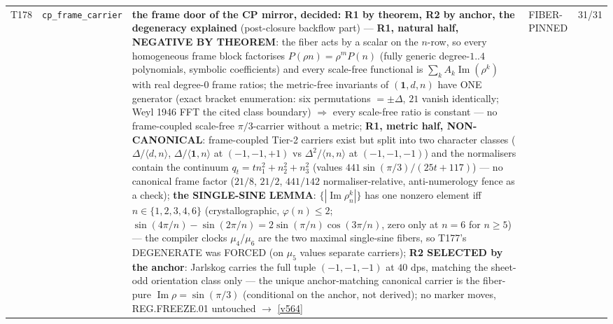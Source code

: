 \documentclass[11pt,a4paper]{article}
\begin{document}
{\begin{xltabular}{\linewidth}{@{}p{0.95cm} >{\raggedright\arraybackslash}p{3.1cm} Y >{\raggedright\scriptsize\arraybackslash}p{3.35cm} p{1.15cm}@{}}
T178 & \texttt{\scriptsize cp\_frame\_\allowbreak carrier} & \textbf{the frame door of the CP mirror, decided: R1 by theorem, R2 by anchor, the degeneracy explained} (post-closure backflow part) --- \textbf{R1, natural half, NEGATIVE BY THEOREM}: the fiber acts by a scalar on the $n$-row, so every homogeneous frame block factorises $P(\rho n)=\rho^{m}P(n)$ (fully generic degree-$1..4$ polynomials, symbolic coefficients) and every scale-free functional is $\sum_k A_k\operatorname{Im}(\rho^k)$ with real degree-$0$ frame ratios; the metric-free invariants of $(\mathbf1,d,n)$ have ONE generator (exact bracket enumeration: six permutations $=\pm\Delta$, $21$ vanish identically; Weyl 1946 FFT the cited class boundary) $\Rightarrow$ every scale-free ratio is constant --- no frame-coupled scale-free $\pi/3$-carrier without a metric; \textbf{R1, metric half, NON-CANONICAL}: frame-coupled Tier-2 carriers exist but split into two character classes ($\Delta/\langle d,n\rangle$, $\Delta/\langle\mathbf1,n\rangle$ at $(-1,-1,+1)$ vs $\Delta^{2}/\langle n,n\rangle$ at $(-1,-1,-1)$) and the normalisers contain the continuum $q_t=t n_1^2+n_2^2+n_3^2$ (values $441\sin(\pi/3)/(25t+117)$) --- no canonical frame factor ($21/8$, $21/2$, $441/142$ normaliser-relative, anti-numerology fence as a check); \textbf{the SINGLE-SINE LEMMA}: $\{|\operatorname{Im}\rho_n^k|\}$ has one nonzero element iff $n\in\{1,2,3,4,6\}$ (crystallographic, $\varphi(n)\le2$; $\sin(4\pi/n)-\sin(2\pi/n)=2\sin(\pi/n)\cos(3\pi/n)$, zero only at $n=6$ for $n\ge5$) --- the compiler clocks $\mu_4$/$\mu_6$ are the two maximal single-sine fibers, so T177's DEGENERATE was FORCED (on $\mu_5$ values separate carriers); \textbf{R2 SELECTED by the anchor}: Jarlskog carries the full tuple $(-1,-1,-1)$ at $40$ dps, matching the sheet-odd orientation class only --- the unique anchor-matching canonical carrier is the fiber-pure $\operatorname{Im}\rho=\sin(\pi/3)$ (conditional on the anchor, not derived); no marker moves, REG.FREEZE.01 untouched $\to$ \vref{v564} & FIBER-PINNED & 31/31\\

\end{xltabular}}
\end{document}
